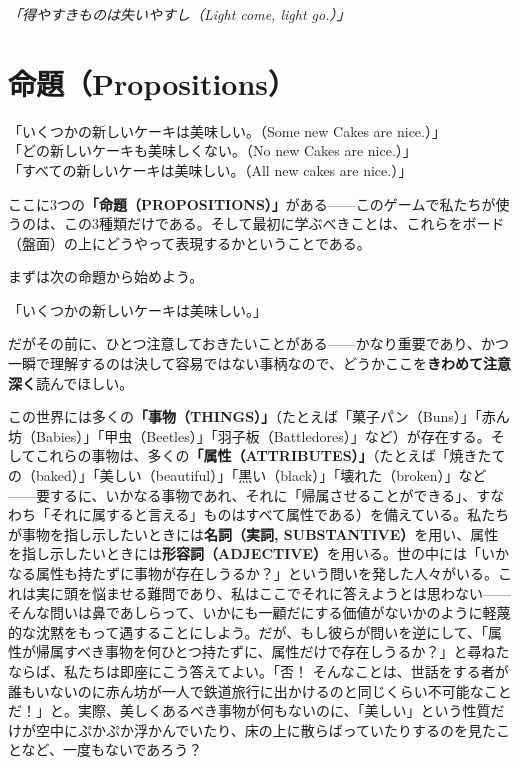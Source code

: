 \documentclass[a4paper,11pt,openany]{ltjsbook}
\begin{document}
\begin{center}
\textit{「得やすきものは失いやすし（Light come, light go.）」}
\end{center}

\section{命題（Propositions）}

\begin{center}
「いくつかの新しいケーキは美味しい。（Some new Cakes are nice.）」\\
「どの新しいケーキも美味しくない。（No new Cakes are nice.）」\\
「すべての新しいケーキは美味しい。（All new cakes are nice.）」
\end{center}

ここに3つの\textbf{「命題（PROPOSITIONS）」}がある——このゲームで私たちが使うのは、この3種類だけである。そして最初に学ぶべきことは、これらをボード（盤面）の上にどうやって表現するかということである。

まずは次の命題から始めよう。
\begin{center}
「いくつかの新しいケーキは美味しい。」
\end{center}

だがその前に、ひとつ注意しておきたいことがある——かなり重要であり、かつ一瞬で理解するのは決して容易ではない事柄なので、どうかここを\textbf{きわめて注意深く}読んでほしい。

この世界には多くの\textbf{「事物（THINGS）」}（たとえば「菓子パン（Buns）」「赤ん坊（Babies）」「甲虫（Beetles）」「羽子板（Battledores）」など）が存在する。そしてこれらの事物は、多くの\textbf{「属性（ATTRIBUTES）」}（たとえば「焼きたての（baked）」「美しい（beautiful）」「黒い（black）」「壊れた（broken）」など——要するに、いかなる事物であれ、それに「帰属させることができる」、すなわち「それに属すると言える」ものはすべて属性である）を備えている。私たちが事物を指し示したいときには\textbf{名詞（実詞, SUBSTANTIVE）}を用い、属性を指し示したいときには\textbf{形容詞（ADJECTIVE）}を用いる。世の中には「いかなる属性も持たずに事物が存在しうるか？」という問いを発した人々がいる。これは実に頭を悩ませる難問であり、私はここでそれに答えようとは思わない——そんな問いは鼻であしらって、いかにも一顧だにする価値がないかのように軽蔑的な沈黙をもって遇することにしよう。だが、もし彼らが問いを逆にして、「属性が帰属すべき事物を何ひとつ持たずに、属性だけで存在しうるか？」と尋ねたならば、私たちは即座にこう答えてよい。「否！ そんなことは、世話をする者が誰もいないのに赤ん坊が一人で鉄道旅行に出かけるのと同じくらい不可能なことだ！」と。実際、美しくあるべき事物が何もないのに、「美しい」という性質だけが空中にぷかぷか浮かんでいたり、床の上に散らばっていたりするのを見たことなど、一度もないであろう？
\end{document}
